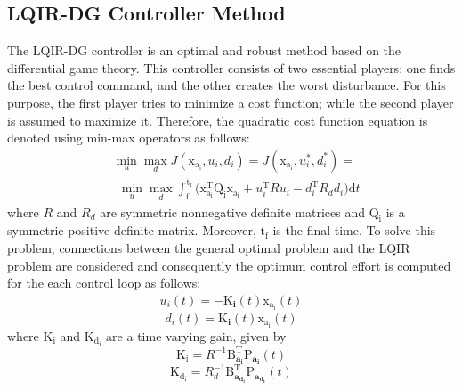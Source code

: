 \documentclass[conference]{IEEEtran}
\begin{document}
\subsection{LQIR-DG Controller Method}
\noindent The LQIR-DG controller is an optimal and robust method based on the differential game theory. This controller consists of two essential players: one finds the best control command, and the other creates the worst disturbance. 
For this purpose, the first player tries to minimize a cost function; while the second player is assumed to maximize it. Therefore, the quadratic cost function equation is denoted using min-max operators as follows:
\begin{equation}
	    \begin{split}
		&\min_{u} \max_{d} J(\boldsymbol{\mathrm{x_{a_i}}}, {u_i}, {d_i}) = J(\boldsymbol{\mathrm{x_{a_i}}}, {u^*_i}, {d^*_i})= \\ & ~~\min_{u} \max_{d}
         \int_{0}^{\mathrm{t_f}}\biggl (\boldsymbol{\mathrm{x^\mathrm{T}_{a_i}}}  \boldsymbol{\mathrm{Q_i}} \boldsymbol{\mathrm{x_{a_i}}}+
        {{u^\mathrm{T}_i}}  {{R}} {{u_i}}-
        {{d^\mathrm{T}_{i}}} {{ R_{d} d_{i}}}
        \biggl )\mathrm{d}t
    \end{split}
\end{equation}
where ${{ R}}$ and ${{R_{d}}}$ are symmetric nonnegative definite matrices and $\boldsymbol{\mathrm{Q_i}} $ is a symmetric positive definite matrix.  Moreover, $\mathrm{t_f}$ is the final time. To solve this problem, connections between the general optimal problem and the LQIR problem are considered \cite{LQDG} and consequently the optimum control effort is computed for the each control loop as follows:
\begin{equation}
	\begin{split}
		{{u_i}}(t) = -\boldsymbol{{\mathrm{K}}_{i}}(t) \boldsymbol{{\mathrm{x_{a_i}}}}(t)
	\end{split}
\end{equation}
\begin{equation}
	{{d_i}}(t) = \boldsymbol{{\mathrm{K}}_{i}}(t)\boldsymbol{{\mathrm{x_{a_i}}}}(t)
\end{equation}
where $\boldsymbol{{\mathrm{K_i}}}$ and $\boldsymbol{{\mathrm{K_{d_i}}}}$ are a time varying gain, given by
\begin{equation}
	\boldsymbol{{\mathrm{K_i}}} = {{{R}}^{-1}}\boldsymbol{{\mathrm{B}_{a_i}^\mathrm{T}}}\boldsymbol{{\mathrm{P}}_{a_i}}(t)
\end{equation}
\begin{equation}
	\boldsymbol{{\mathrm{K_{d_i}}}} = {{{R}}^{-1}_{d}}\boldsymbol{{\mathrm{B}_{a_{d_i}}^\mathrm{T}}}\boldsymbol{{\mathrm{P}}_{a_{d_i}}}(t)
\end{equation}
\end{document}
